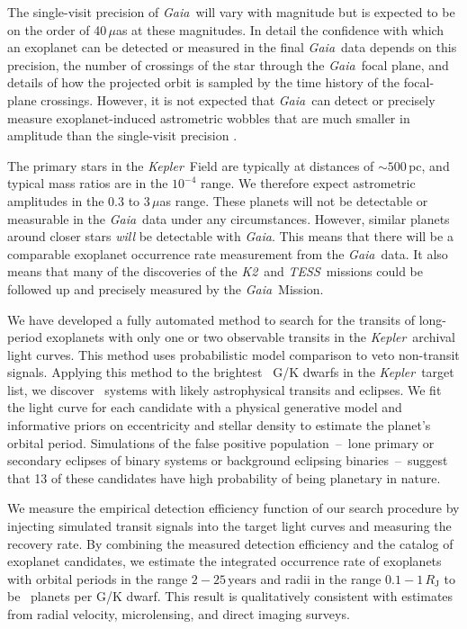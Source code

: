 \documentclass[manuscript, letterpaper]{aastex6}
\makeatletter
\let\origsection\section
\renewcommand\section{\@ifstar{\starsection}{\nostarsection}}
\newcommand\nostarsection[1]{\sectionprelude\origsection{#1}}
\newcommand\starsection[1]{\sectionprelude\origsection*{#1}}
\newcommand\sectionprelude{\vspace{1em}}
\newcommand{\project}[1]{\textsl{#1}}
\newcommand{\kepler}{\project{Kepler}}
\newcommand{\KT}{\project{K2}}
\newcommand{\tess}{\project{TESS}}
\newcommand{\gaia}{\project{Gaia}}
\newcommand{\sectlabel}[1]{\label{sect:#1}}
\newcommand{\unit}[1]{{\ensuremath{\,\mathrm{#1}}}}
\makeatother
\begin{document}
The single-visit precision of \gaia\ will vary with magnitude but is expected
to be on the order of 40\,$\mu$as at these magnitudes.
In detail the confidence with which an exoplanet can be detected or measured
in the final \gaia\ data depends on this precision, the number of crossings of
the star through the \gaia\ focal plane, and details of how the projected
orbit is sampled by the time history of the focal-plane crossings.
However, it is not expected that \gaia\ can detect or precisely measure
exoplanet-induced astrometric wobbles that are much smaller in amplitude than
the single-visit precision \citep{Perryman:2014}.

The primary stars in the \kepler\  Field are typically at distances of $\sim
500$\,pc, and typical mass ratios are in the $10^{-4}$ range.
We therefore expect astrometric amplitudes in the 0.3 to 3\,$\mu$as range.
These planets will not be detectable or measurable in the \gaia\ data under
any circumstances.
However, similar planets around closer stars \emph{will} be detectable with
\gaia.
This means that there will be a comparable exoplanet occurrence rate
measurement from the \gaia\ data.
It also means that many of the discoveries of the \KT\ and \tess\ missions
could be followed up and precisely measured by the \gaia\ Mission.


\section{Summary}\sectlabel{summary}

We have developed a fully automated method to search for the transits of
long-period exoplanets with only one or two observable transits in the
\kepler\ archival light curves.
This method uses probabilistic model comparison to veto non-transit signals.
Applying this method to the brightest \numtargets\ G/K dwarfs in the \kepler\
target list, we discover \numcands\ systems with likely astrophysical
transits and eclipses.
We fit the light curve for each candidate with a physical generative model and
informative priors on eccentricity and stellar density to estimate the
planet's orbital period.
Simulations of the false positive population~--~lone primary or secondary eclipses of
binary systems or background eclipsing binaries~--~suggest that 13 of these
candidates have high probability of being planetary in nature.

We measure the empirical detection efficiency function of our search procedure
by injecting simulated transit signals into the target light curves and
measuring the recovery rate.
By combining the measured detection efficiency and the catalog of exoplanet
candidates, we estimate the integrated occurrence rate of exoplanets with
orbital periods in the range $2-25\unit{years}$ and radii in the range
$0.1-1\,R_\mathrm{J}$ to be \intocc\ planets per G/K dwarf.
This result is qualitatively consistent with estimates from radial velocity,
microlensing, and direct imaging surveys.
\end{document}
